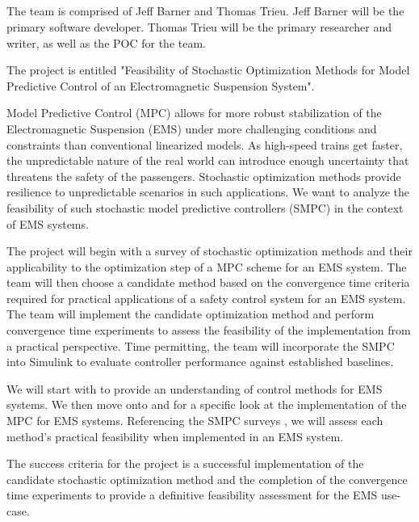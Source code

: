 \documentclass[11pt]{article}
\title{\textbf{\course} \\ \assignment}
\author{\name}
\date{\datefixed}
\begin{document}
\maketitle

The team is comprised of Jeff Barner and Thomas Trieu.
Jeff Barner will be the primary software developer.
Thomas Trieu will be the primary researcher and writer, as well as the POC for the team.

The project is entitled "Feasibility of Stochastic Optimization Methods for Model Predictive Control of an Electromagnetic Suspension System".

Model Predictive Control (MPC) allows for more robust stabilization of the Electromagnetic Suspension (EMS) under more challenging conditions and constraints than conventional linearized models. As high-speed trains get faster, the unpredictable nature of the real world can introduce enough uncertainty that threatens the safety of the passengers. Stochastic optimization methods provide resilience to unpredictable scenarios in such applications. We want to analyze the feasibility of such stochastic model predictive controllers (SMPC) in the context of EMS systems.

The project will begin with a survey of stochastic optimization methods and their applicability to the optimization step of a MPC scheme for an EMS system. The team will then choose a candidate method based on the convergence time criteria required for practical applications of a safety control system for an EMS system. The team will implement the candidate optimization method and perform convergence time experiments to assess the feasibility of the implementation from a practical perspective. Time permitting, the team will incorporate the SMPC into Simulink to evaluate controller performance against established baselines.

We will start with \cite{zhu_2024} to provide an understanding of control methods for EMS systems.
We then move onto \cite{zhang_2020} and \cite{kargl2026embeddedmodelpredictivecontrol} for a specific look at the implementation of the MPC for EMS systems.
Referencing the SMPC surveys \cite{smpcSurvey1, smpcSurvey2, smpcSurvey3}, we will assess each method’s practical feasibility when implemented in an EMS system.

The success criteria for the project is a successful implementation of the candidate stochastic optimization method and the completion of the convergence time experiments to provide a definitive feasibility assessment for the EMS use-case.



\end{document}
